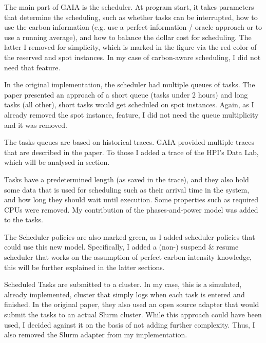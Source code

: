 The main part of GAIA is the scheduler. At program start, it takes parameters that determine the scheduling, such as whether tasks can be interrupted, how to use the carbon information (e.g. use a perfect-information / oracle approach or to use a running average), and how to balance the dollar cost for scheduling. 
The latter I removed for simplicity, which is marked in the figure via the red color of the reserved and spot instances. In my case of carbon-aware scheduling, I did not need that feature.

In the original implementation, the scheduler had multiple queues of tasks. 
The paper presented an approach of a short queue (tasks under 2 hours) and long tasks (all other), short tasks would get scheduled on spot instances. 
Again, as I already removed the spot instance, feature, I did not need the queue multiplicity and it was removed.

The tasks queues are based on historical traces. GAIA provided multiple traces that are described in the paper. To those I added a trace of the HPI's Data Lab, which will be analysed in section.

Tasks have a predetermined length (as saved in the trace), and they also hold some data that is used for scheduling such as their arrival time in the system, and how long they should wait until execution. 
Some properties such as required CPUs were removed.
My contribution of the phases-and-power model was added to the tasks.

The Scheduler policies are also marked green, as I added scheduler policies that could use this new model. Specifically, I added a (non-) suspend \& resume scheduler that works on the assumption of perfect carbon intensity knowledge, this will be further explained in the latter sections.

Scheduled Tasks are submitted to a cluster.
In my case, this is a simulated, already implemented, cluster that simply logs when each task is entered and finished. 
In the original paper, they also used an open source adapter that would submit the tasks to an actual Slurm cluster. 
While this approach could have been used, I decided against it on the basis of not adding further complexity. 
Thus, I also removed the Slurm adapter from my implementation.

